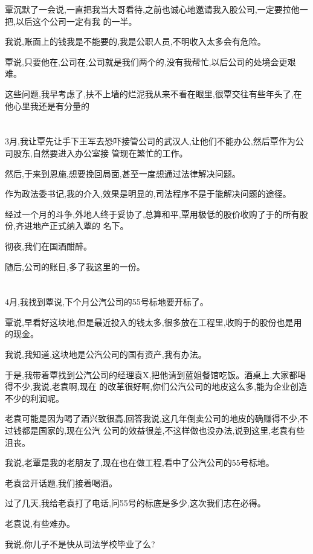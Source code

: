 \documentclass[11pt]{article}
\begin{document}
覃沉默了一会说,一直把我当大哥看待,之前也诚心地邀请我入股公司,一定要拉他一把,以后这个公司一定有我
的一半。

我说,账面上的钱我是不能要的,我是公职人员,不明收入太多会有危险。

覃说,只要他在,公司在,公司就是我们两个的,没有我帮忙,以后公司的处境会更艰难。

这些问题,我早考虑了,扶不上墙的烂泥我从来不看在眼里,很覃交往有些年头了,在他心里我还是有分量的

\section{}
3月,我让覃先让手下王军去恐吓接管公司的武汉人,让他们不能办公,然后覃作为公司股东,自然要进入办公室接
管现在繁忙的工作。

然后,于来到恩施,想要挽回局面,甚至一度想通过法律解决问题。

作为政法委书记,我的介入,效果是明显的,司法程序不是于能解决问题的途径。

经过一个月的斗争,外地人终于妥协了,总算和平,覃用极低的股价收购了于的所有股份,齐进地产正式纳入覃的
名下。

彻夜,我们在国酒酣醉。

随后,公司的账目,多了我这里的一份。

\section{}
4月,我找到覃说,下个月公汽公司的55号标地要开标了。

覃说,早看好这块地,但是最近投入的钱太多,很多放在工程里,收购于的股份也是用的现金。

我说,我知道,这块地是公汽公司的国有资产,我有办法。

于是,我带着覃找到公汽公司的经理袁X,把他请到蓝姐餐馆吃饭。酒桌上,大家都喝得不少,我说,老袁啊,现在
的改革很好啊,你们公汽公司的地皮这么多,能为企业创造不少的利润呢。

老袁可能是因为喝了酒兴致很高,回答我说,这几年倒卖公司的地皮的确赚得不少,不过钱都是国家的,现在公汽
公司的效益很差,不这样做也没办法,说到这里,老袁有些沮丧。

我说,老覃是我的老朋友了,现在也在做工程,看中了公汽公司的55号标地。

老袁岔开话题,我们接着喝酒。

过了几天,我给老袁打了电话,问55号的标底是多少,这次我们志在必得。

老袁说,有些难办。

我说,你儿子不是快从司法学校毕业了么?
\end{document}
